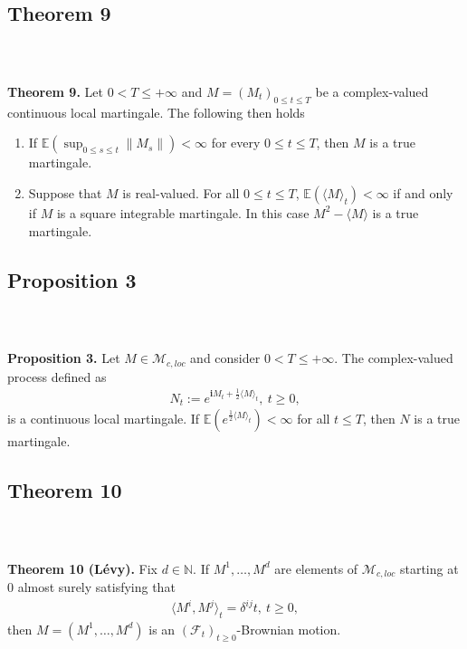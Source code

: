 \documentclass{beamer}
\numberwithin{equation}{section}
\newenvironment{frame2}{\begin{frame}\frametitle{{\normalsize \secname} \\ {\large \subsecname}}}{\end{frame}}
\begin{document}
\subsection{Theorem 9}

\begin{frame2}
    \textbf{Theorem 9.}
    Let $0 < T \leq +\infty$ and $M = (M_t)_{0\leq t \leq T}$ be a complex-valued continuous local martingale.
    The following then holds
    \begin{enumerate}
        \item If $\mathbb{E}(\sup_{0 \leq s \leq t} \| M_s \|) < \infty$ for every $ 0 \leq t \leq T$, then $M$ is a true martingale.
        \item Suppose that $M$ is real-valued.
        For all $0 \leq t \leq T$, $\mathbb{E}(\langle M \rangle_t) < \infty$ if and only if $M$ is a square integrable martingale.
        In this case $M^2 - \langle M \rangle$ is a true martingale.
    \end{enumerate}
\end{frame2}

\subsection{Proposition 3}

\begin{frame2}
    \textbf{Proposition 3.}
    Let $M \in \mathcal{M}_{c,loc}$ and consider $0 < T \leq + \infty$.
    The complex-valued process defined as
    \begin{align}
        N_t := e^{\textbf{i}M_t + \frac{1}{2}\langle M \rangle_t}, \ t \geq 0,
    \end{align}
    is a continuous local martingale.
    If $\mathbb{E}\left(e^{\frac{1}{2}\langle M \rangle_t}\right) < \infty$ for all $t \leq T$, then $N$ is a true martingale.
\end{frame2}

\subsection{Theorem 10}

\begin{frame2}
    \textbf{Theorem 10 (Lévy).}
    Fix $d \in \mathbb{N}$.
    If $M^1,\ldots,M^d$ are elements of $\mathcal{M}_{c,loc}$ starting at 0 almost surely satisfying that
    \begin{align}
        \langle M^i,M^j \rangle_t = \delta^{ij}t, \ t \geq 0,
    \end{align}
    then $M = (M^1, \ldots, M^d)$ is an $(\mathcal{F}_t)_{t \geq 0}$-Brownian motion.
\end{frame2}
\end{document}
